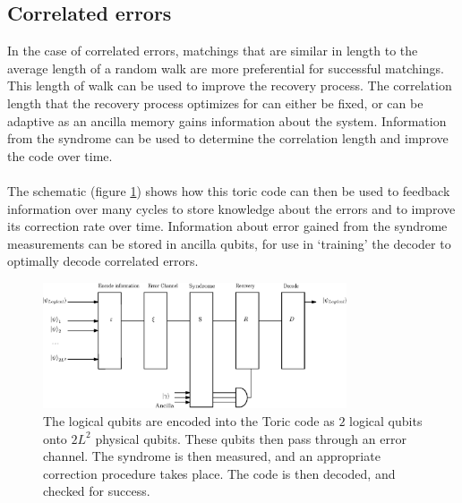  	\subsection{Correlated errors}

	In the case of correlated errors, matchings that are similar in length to the average length of a random walk are more preferential for successful matchings. This length of walk can be used to improve the recovery process. The correlation length that the recovery process optimizes for can either be fixed, or can be adaptive as an ancilla memory gains information about the system. Information from the syndrome can be used to determine the correlation length and improve the code over time. 
	\\\\
	The schematic (figure \ref{fig:schematic}) shows how this toric code can then be used to feedback information over many cycles to store knowledge about the errors and to improve its correction rate over time. Information about error gained from the syndrome measurements can be stored in ancilla qubits, for use in `training' the decoder to optimally decode correlated errors.
	
	\begin{figure}[htpb]
	\centering
	\includegraphics[width =0.8\textwidth]{figs/schematic.eps}
	\caption{The logical qubits are encoded into the Toric code as $2$ logical qubits onto $2L^2$ physical qubits. These qubits then pass through an error channel. The syndrome is then measured, and an appropriate correction procedure takes place. The code is then decoded, and checked for success. }
	\label{fig:schematic}
	\end{figure}


